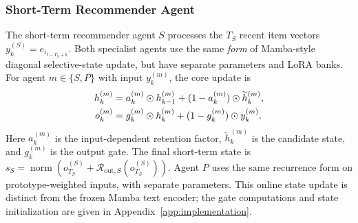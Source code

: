 \documentclass[11pt]{article}
\newcommand{\norm}[1]{\operatorname{norm}(#1)}
\begin{document}
\subsubsection{Short-Term Recommender Agent}
The short-term recommender agent $S$ processes the $T_S$ recent item vectors $y_k^{(S)}=e_{i_{t-T_S+k}}$. Both specialist agents use the same \emph{form} of Mamba-style diagonal selective-state update, but have separate parameters and LoRA banks. For agent $m\in\{S,P\}$ with input $y_k^{(m)}$, the core update is
\begin{align}
 h_k^{(m)}&=a_k^{(m)}\odot h_{k-1}^{(m)} +(1-a_k^{(m)})\odot\widetilde h_k^{(m)},\notag\\
 o_k^{(m)}&=g_k^{(m)}\odot h_k^{(m)} +(1-g_k^{(m)})\odot y_k^{(m)}.
 \label{eq:state_update}
\end{align}
Here $a_k^{(m)}$ is the input-dependent retention factor, $\widetilde h_k^{(m)}$ is the candidate state, and $g_k^{(m)}$ is the output gate. The final short-term state is $s_S=\norm{o_{T_S}^{(S)}+\mathcal R_{\mathrm{out},S}(o_{T_S}^{(S)})}$. Agent $P$ uses the same recurrence form on prototype-weighted inputs, with separate parameters. This online state update is distinct from the frozen Mamba text encoder; the gate computations and state initialization are given in Appendix~\ref{app:implementation}.
\end{document}
